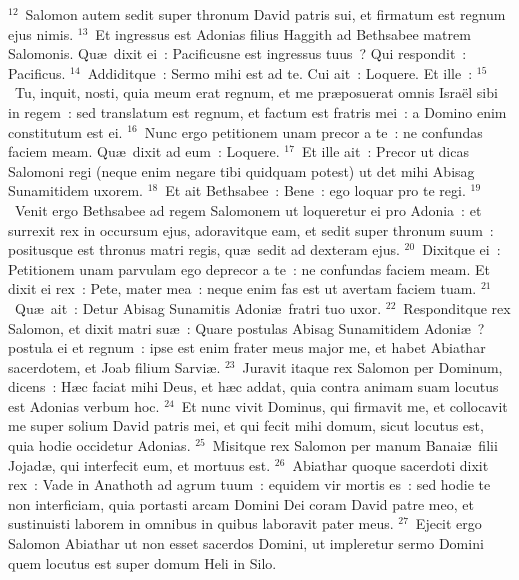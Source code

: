 ${}^{12}$~Salomon autem sedit super thronum David patris sui, et firmatum est regnum ejus nimis.
${}^{13}$~Et ingressus est Adonias filius Haggith ad Bethsabee matrem Salomonis. Qu\ae\ dixit ei~: Pacificusne est ingressus tuus~? Qui respondit~: Pacificus.
${}^{14}$~Addiditque~: Sermo mihi est ad te. Cui ait~: Loquere. Et ille~:
${}^{15}$~Tu, inquit, nosti, quia meum erat regnum, et me pr\ae posuerat omnis Isra\"el sibi in regem~: sed translatum est regnum, et factum est fratris mei~: a Domino enim constitutum est ei.
${}^{16}$~Nunc ergo petitionem unam precor a te~: ne confundas faciem meam. Qu\ae\ dixit ad eum~: Loquere.
${}^{17}$~Et ille ait~: Precor ut dicas Salomoni regi (neque enim negare tibi quidquam potest) ut det mihi Abisag Sunamitidem uxorem.
${}^{18}$~Et ait Bethsabee~: Bene~: ego loquar pro te regi.
${}^{19}$~Venit ergo Bethsabee ad regem Salomonem ut loqueretur ei pro Adonia~: et surrexit rex in occursum ejus, adoravitque eam, et sedit super thronum suum~: positusque est thronus matri regis, qu\ae\ sedit ad dexteram ejus.
${}^{20}$~Dixitque ei~: Petitionem unam parvulam ego deprecor a te~: ne confundas faciem meam. Et dixit ei rex~: Pete, mater mea~: neque enim fas est ut avertam faciem tuam.
${}^{21}$~Qu\ae\ ait~: Detur Abisag Sunamitis Adoni\ae\ fratri tuo uxor.
${}^{22}$~Responditque rex Salomon, et dixit matri su\ae~: Quare postulas Abisag Sunamitidem Adoni\ae~? postula ei et regnum~: ipse est enim frater meus major me, et habet Abiathar sacerdotem, et Joab filium Sarvi\ae .
${}^{23}$~Juravit itaque rex Salomon per Dominum, dicens~: H\ae c faciat mihi Deus, et h\ae c addat, quia contra animam suam locutus est Adonias verbum hoc.
${}^{24}$~Et nunc vivit Dominus, qui firmavit me, et collocavit me super solium David patris mei, et qui fecit mihi domum, sicut locutus est, quia hodie occidetur Adonias.
${}^{25}$~Misitque rex Salomon per manum Banai\ae\ filii Jojad\ae , qui interfecit eum, et mortuus est.
${}^{26}$~Abiathar quoque sacerdoti dixit rex~: Vade in Anathoth ad agrum tuum~: equidem vir mortis es~: sed hodie te non interficiam, quia portasti arcam Domini Dei coram David patre meo, et sustinuisti laborem in omnibus in quibus laboravit pater meus.
${}^{27}$~Ejecit ergo Salomon Abiathar ut non esset sacerdos Domini, ut impleretur sermo Domini quem locutus est super domum Heli in Silo.


